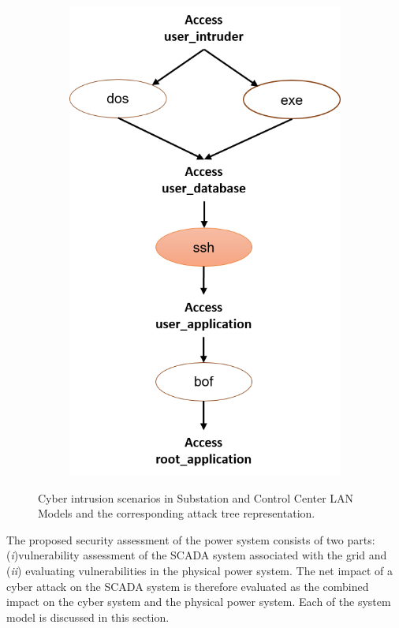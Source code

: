 \begin{figure}[htbp]
\begin{subfigure}{0.33\textwidth}
	\caption{}\label{sfig:model-CC}
	\end{subfigure}
	\begin{subfigure}{0.12\textwidth}
	\includegraphics[width=\textwidth]{CC-graph.png}
	\caption{}\label{sfig:graph-CC}
	\end{subfigure}
	\caption{Cyber intrusion scenarios in Substation and Control Center LAN Models and the corresponding attack tree representation.}
\end{figure}
The proposed security assessment of the power system consists of two parts: (\textit{i})vulnerability assessment of the SCADA system associated with the grid and (\textit{ii}) evaluating vulnerabilities in the physical power system. The net impact of a cyber attack on the SCADA system is therefore evaluated as the combined impact on the cyber system and the physical power system. Each of the system model is discussed in this section.
